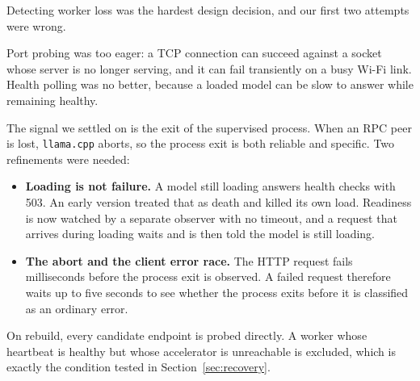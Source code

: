 Detecting worker loss was the hardest design decision, and our first two
attempts were wrong.

Port probing was too eager: a TCP connection can succeed against a socket whose
server is no longer serving, and it can fail transiently on a busy Wi-Fi link.
Health polling was no better, because a loaded model can be slow to answer
while remaining healthy.

The signal we settled on is the exit of the supervised 
process. When an RPC peer is lost, \texttt{llama.cpp} aborts, so the process
exit is both reliable and specific. Two refinements were needed:

\begin{itemize}[leftmargin=1.4em,itemsep=2pt]
  \item \textbf{Loading is not failure.} A model still loading answers health
        checks with 503. An early version treated that as death and killed its
        own load. Readiness is now watched by a separate observer with no
        timeout, and a request that arrives during loading waits and is then
        told the model is still loading.
  \item \textbf{The abort and the client error race.} The HTTP request fails
        milliseconds before the process exit is observed. A failed request
        therefore waits up to five seconds to see whether the process exits
        before it is classified as an ordinary error.
\end{itemize}

On rebuild, every candidate endpoint is probed directly. A worker whose
heartbeat is healthy but whose accelerator is unreachable is excluded, which is
exactly the condition tested in Section~\ref{sec:recovery}.
